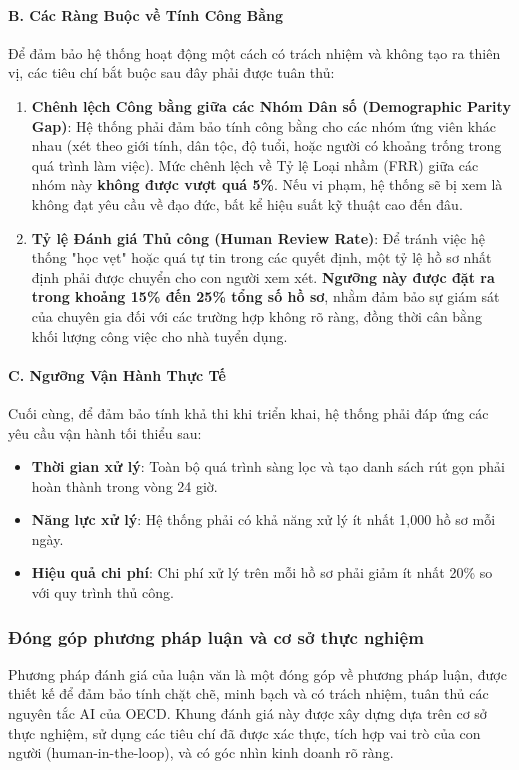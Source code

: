 \documentclass{article}
\begin{document}
\paragraph{B. Các Ràng Buộc về Tính Công Bằng}
Để đảm bảo hệ thống hoạt động một cách có trách nhiệm và không tạo ra thiên vị, các tiêu chí bắt buộc sau đây phải được tuân thủ:
\begin{enumerate}[topsep=0pt, itemsep=4pt, leftmargin=40pt, label=\arabic*.]
    \item \textbf{Chênh lệch Công bằng giữa các Nhóm Dân số (Demographic Parity Gap)}: Hệ thống phải đảm bảo tính công bằng cho các nhóm ứng viên khác nhau (xét theo giới tính, dân tộc, độ tuổi, hoặc người có khoảng trống trong quá trình làm việc). Mức chênh lệch về Tỷ lệ Loại nhầm (FRR) giữa các nhóm này \textbf{không được vượt quá 5\%}. Nếu vi phạm, hệ thống sẽ bị xem là không đạt yêu cầu về đạo đức, bất kể hiệu suất kỹ thuật cao đến đâu.
    \item \textbf{Tỷ lệ Đánh giá Thủ công (Human Review Rate)}: Để tránh việc hệ thống "học vẹt" hoặc quá tự tin trong các quyết định, một tỷ lệ hồ sơ nhất định phải được chuyển cho con người xem xét. \textbf{Ngưỡng này được đặt ra trong khoảng 15\% đến 25\% tổng số hồ sơ}, nhằm đảm bảo sự giám sát của chuyên gia đối với các trường hợp không rõ ràng, đồng thời cân bằng khối lượng công việc cho nhà tuyển dụng.
\end{enumerate}

\paragraph{C. Ngưỡng Vận Hành Thực Tế}
Cuối cùng, để đảm bảo tính khả thi khi triển khai, hệ thống phải đáp ứng các yêu cầu vận hành tối thiểu sau:

\begin{itemize}[topsep=0pt, itemsep=4pt, leftmargin=40pt]
    \item \textbf{Thời gian xử lý}: Toàn bộ quá trình sàng lọc và tạo danh sách rút gọn phải hoàn thành trong vòng 24 giờ.
    \item \textbf{Năng lực xử lý}: Hệ thống phải có khả năng xử lý ít nhất 1,000 hồ sơ mỗi ngày.
    \item \textbf{Hiệu quả chi phí}: Chi phí xử lý trên mỗi hồ sơ phải giảm ít nhất 20\% so với quy trình thủ công.
\end{itemize}

\subsubsection{Đóng góp phương pháp luận và cơ sở thực nghiệm}
Phương pháp đánh giá của luận văn là một đóng góp về phương pháp luận, được thiết kế để đảm bảo tính chặt chẽ, minh bạch và có trách nhiệm, tuân thủ các nguyên tắc AI của OECD. Khung đánh giá này được xây dựng dựa trên cơ sở thực nghiệm, sử dụng các tiêu chí đã được xác thực, tích hợp vai trò của con người (human-in-the-loop), và có góc nhìn kinh doanh rõ ràng.
\end{document}
